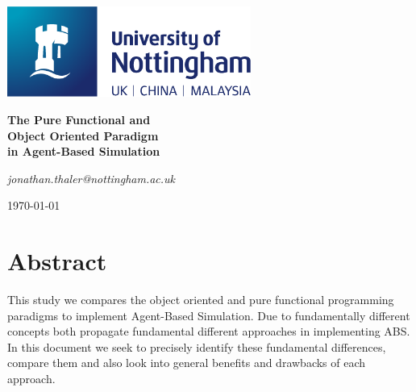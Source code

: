 \documentclass[oneside]{book}
\begin{document}
\begin{titlepage}
	\centering
	\includegraphics[width=0.60\textwidth]{../../logo/UoN_Primary_Logo_RGB.png}\par\vspace{1cm}
	\vspace{1.5cm}
	{\huge\bfseries The Pure Functional and \\ Object Oriented Paradigm \\ in Agent-Based Simulation \par}
	\vspace{2cm}
	{\Large\itshape jonathan.thaler@nottingham.ac.uk \par}
	\vfill
	
	\vfill

	{\large \today\par}
\end{titlepage}

\cleardoublepage

\section*{Abstract}
This study we compares the object oriented and pure functional programming paradigms to implement Agent-Based Simulation. Due to fundamentally different concepts both propagate fundamental different approaches in implementing ABS. In this document we seek to precisely identify these fundamental differences, compare them and also look into general benefits and drawbacks of each approach.

\clearpage
\tableofcontents
\clearpage





















\renewcommand\bibname{References}



\end{document}
